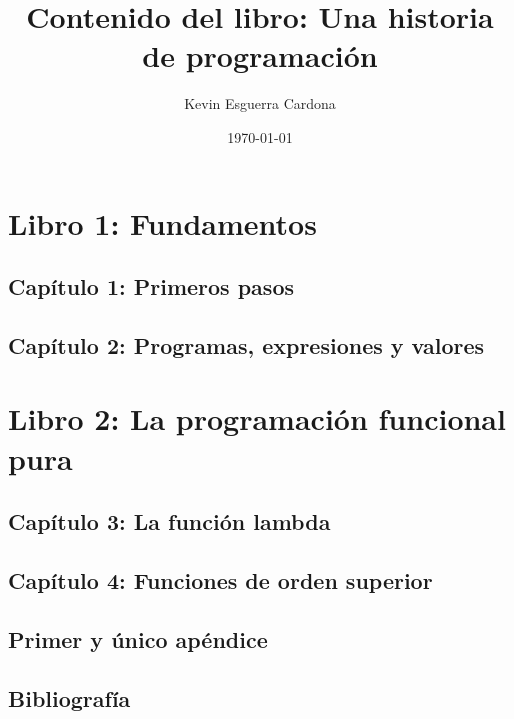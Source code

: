 \documentclass{book}
\title{Contenido del libro: Una historia de programación}
\author{Kevin Esguerra Cardona}
\date{\today}
\begin{document}
\maketitle
    



\mainmatter
\part*{Libro 1: Fundamentos}
\chapter*{Capítulo 1: Primeros pasos}
\chapter*{Capítulo 2: Programas, expresiones y valores}

\part*{Libro 2: La programación funcional pura}
\chapter*{Capítulo 3: La función lambda}
\chapter*{Capítulo 4: Funciones de orden superior}

\appendix
\chapter*{Primer y único apéndice}

\backmatter
\chapter*{Bibliografía}
\end{document}
